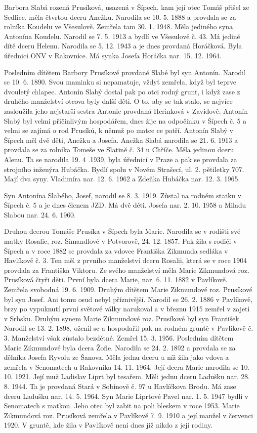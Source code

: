 \documentclass[../dejiny-rodu-prusiku.tex]{subfiles}
\begin{document}
Barbora Slabá rozená Prusíková, usazená v Šípech, kam její otec Tomáš přišel ze  Sedlice, měla čtvrtou dceru Anežku. Narodila se 10. 5. 1888 a provdala se za rolníka Koudelu ve Všesulově. Zemřela tam 30. 1. 1948. Měla jediného syna Antonína Koudelu. Narodil se 7. 5. 1913 a bydlí ve Všesulově č. 43. Má jediné dítě dceru Helenu. Narodila se 5. 12. 1943 a je dnes provdaná Horáčková. Byla úřednicí ONV v Rakovníce. Má synka Josefa Horáčka nar. 15. 12. 1964.

Posledním dítětem Barbory Prusíkové provdané Slabé byl syn Antonín. Narodil se 10. 6. 1890. Svou maminku si nepamatuje, vždyť zemřela, když byl teprve dvouletý chlapec. Antonín Slabý dostal pak po otci rodný grunt, i když zase z druhého manželství otcova byly další děti. O to, aby se tak stalo, se nejvíce zasloužila jeho nejstarší sestra Antonie provdaná Herinková v Zavidově. Antonín Slabý byl velmi přičinlivým hospodářem, dnes žije na odpočinku v Šípech č. 5 a velmi se zajímá o rod Prusíků, k němuž po matce
ce patří. Antonín Slabý v Šípech měl dvě děti, Anežku a Josefa. Anežka Slabá narodila se 21. 6. 1913 a provdala se za rolníka Tomeše ve Slatině č. 34 u Chříče. Měla je­dinou dceru Alenu. Ta se narodila 19. 4 .1939, byla úřednicí v Praze a pak se provdala za strojního inženýra Hubáčka. Bydlí spolu v Novém Strašecí, ul. 2. pětiletky 707. Mají dva syny. Vladimíra nar. 12. 6. 1962 a Zdeňka Hubáčka nar. 12. 3. 1965.

Syn Antonína Slabého, Josef, narodil se 8. 3. 1919. Zůstal na rodném statku v Šípech č. 5 a je dnes členem JZD. Má dvě děti. Josefa nar. 2. 10. 1958 a Miladu Slabou nar. 24. 6. 1960.

Druhou dcerou Tomáše Prusíka v Šípech byla Marie. Narodila se v rodišti své matky Rosalie, roz. Šimandlové v Potvorově, 24. 12. 1857. Pak žila s rodiči v Šípech a v roce 1882 se provdala za vdovce Františka Zikmunda sedláka v Havlíkově č. 3. Ten měl z prvního manželství dceru Rosalii, která se v roce 1904 provdala za Fran­tiška Viktoru. Ze svého manželství měla Marie Zikmundová roz. Prusíková čtyři děti. První byla dcera Marie, nar. 6. 11. 1882 v Pavlíkově. Zemřela svobodná 19. 6. 1909. Druhým dítětem Marie Zikmundové roz. Prusíkové byl syn Josef. Ani tomu osud nebyl příznivější. Narodil se 26. 2. 1886 v Pavlíkově, brzy po vypuknutí první světové války narukoval a v březnu 1915 zemřel v zajetí v Srbsku. Druhým synem Marie Zikmundové roz. Prusíkové byl syn Fran­tišek. Narodil se 13. 2. 1898, oženil se a hospodařil pak na rodném gruntě v Pavlíkově č. 3. Manželství však zůstalo bezdětné. Zemřel 15. 3. 1956. Posledním dítětem Marie Zikmundové byla dcera Žofie. Narodila se 24. 2. 1892 a provdala se za dělníka Josefa Ryvolu ze Šanova. Měla jednu dceru u níž žila jako vdova a zemřela v Senomatech u Rakovníka 14. 11. 1964. Její dcera Marie narodila se 10. 10. 1921. Její muž Ladislav Liprt byl tesařem. Měli jed­nu dceru Ladušku nar. 28. 8. 1944. Ta je provdaná Stará v Sobínově č. 97 u Havlíčkova Brodu. Má zase dceru Ladušku nar. 14. 5. 1964. Syn Marie Liprtové Pavel nar. 1. 5. 1947 bydlí v Senomatech s matkou. Jeho otec byl zabit na poli bleskem v roce 1953. Marie Zikmundová roz. Prusíková zemřela v Pavlíkově 7. 9. 1910 a její manžel v červenci 1920. V gruntě,  kde žila v Pavlíkově není dnes již nikdo z její rodiny.
\end{document}
